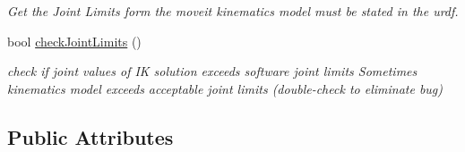 \begin{DoxyCompactItemize}
\begin{DoxyCompactList}\small\item\em Get the Joint Limits form the moveit kinematics model must be stated in the urdf. \end{DoxyCompactList}\item 
bool \hyperlink{classMOVEIT__IK_aecc7b36de162360f11ad460d3fb2321c}{check\+Joint\+Limits} ()
\begin{DoxyCompactList}\small\item\em check if joint values of IK solution exceeds software joint limits Sometimes kinematics model exceeds acceptable joint limits (double-\/check to eliminate bug) \end{DoxyCompactList}\end{DoxyCompactItemize}
\subsection*{Public Attributes}
